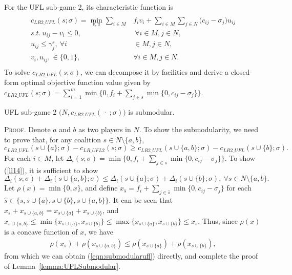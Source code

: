 \documentclass[ijoc,nonblindrev]{informs3} %
\begin{document}
For the UFL sub-game 2, its characteristic function is
\begin{eqnarray}\label{eqn:UFLCFsub2}
\begin{aligned}
\begin{split}
c_{LR2\_UFL}(s;\sigma) = \min_{v,u} \sum_{i \in M} &f_iv_i + \sum_{i \in M} \sum_{j \in N} \big(c_{ij} - \sigma_{j}\big)u_{ij}\\
s.t.~u_{ij} - v_i \leq 0,&~\forall i \in M, j \in N,\\
u_{ij} \leq \gamma_j^s,~\forall i& \in M, j \in N,\\
 v_i,u_{ij}, \in \{0,1\},~&\forall i \in M, j \in N.
\end{split}
\end{aligned}
\end{eqnarray}
To solve $c_{LR2\_UFL}(s:\sigma)$, we can decompose it by facilities and derive a closed-form optimal objective function value given by $c_{LR2\_UFL}(s;\sigma) = \sum_{i=1}^m \min \big\{0,f_i+\sum_{j \in s} \min \{0,c_{ij}-\sigma_j\}\big\}$.

\begin{lemma}\label{lemma:UFLSubmodular}
UFL sub-game 2 $\big(N,c_{LR2\_UFL}(\ \cdot \ ;\sigma)\big)$ is submodular.
\end{lemma}
{\scshape Proof.}
Denote $a$ and $b$ as two players in $N$. To show the submodularity, we need to prove that, for any coalition $s \in N\setminus \big\{a,b\big\}$,
\begin{equation}\label{ll14}
c_{LR2\_UFL}(s \cup \{a\}; \sigma) - c_{LR\_UFL2}(s;\sigma) \geq c_{LR2\_UFL}(s \cup \big\{a,b\big\};\sigma) - c_{LR2\_UFL}(s \cup \{b\};\sigma).
\end{equation}
For each $i\in M$, let $\Delta_i(s;\sigma) = \min \{0, f_i + \sum_{j \in s} \min \{0, c_{ij} - \sigma_j\} \}$. To show (\ref{ll14}), it is  sufficient to show
\begin{equation}\label{eqn:submodularufl}
\Delta_i(s;\sigma) + \Delta_i(s \cup \{a,b\};\sigma) \leq \Delta_i(s \cup \{a\};\sigma) + \Delta_i(s \cup \{b\};\sigma), ~\forall s \in N\setminus\big\{a,b\big\}. \end{equation}
Let $\rho(x)=\min\{0,x\}$, and define $x_{\hat{s}}= f_i + \sum_{j \in \hat{s}} \min \{0, c_{ij} - \sigma_j\}$ for each $\hat{s}\in \{s,s\cup\{a\},s\cup\{b\},s\cup\{a,b\}\}$.
It can be seen that $x_s+x_{s\cup\{a,b\}} = x_{s\cup \{a\}}+x_{s\cup\{b\}}$, and $x_{s\cup\{a,b\}}\leq \min\{x_{s\cup \{a\}},x_{s\cup\{b\}}\}\leq  \max\{x_{s\cup \{a\}},x_{s\cup\{b\}}\} \leq x_{s}$.
Thus, since $\rho(x)$ is a concave function of $x$, we have
\begin{eqnarray*}
  \rho(x_s) + \rho(x_{s\cup \{a,b\}}) \leq \rho(x_{s\cup\{a\}}) + \rho(x_{s\cup \{b\}}),
\end{eqnarray*}
from which we can obtain (\ref{eqn:submodularufl}) directly, and complete the proof of Lemma~\ref{lemma:UFLSubmodular}.
\hfill\Halmos
\end{document}
